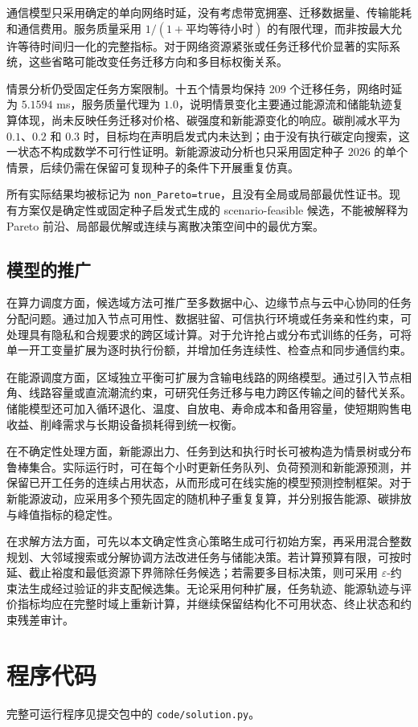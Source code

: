 \documentclass[withoutpreface,bwprint]{cumcmthesis}
\begin{document}
通信模型只采用确定的单向网络时延，没有考虑带宽拥塞、迁移数据量、传输能耗和通信费用。服务质量采用 $1/(1+\text{平均等待小时})$ 的有限代理，而非按最大允许等待时间归一化的完整指标。对于网络资源紧张或任务迁移代价显著的实际系统，这些省略可能改变任务迁移方向和多目标权衡关系。

情景分析仍受固定任务方案限制。十五个情景均保持 $209$ 个迁移任务，网络时延为 $5.1594$ ms，服务质量代理为 $1.0$，说明情景变化主要通过能源流和储能轨迹复算体现，尚未反映任务迁移对价格、碳强度和新能源变化的响应。碳削减水平为 $0.1$、$0.2$ 和 $0.3$ 时，目标均在声明启发式内未达到；由于没有执行碳定向搜索，这一状态不构成数学不可行性证明。新能源波动分析也只采用固定种子 $2026$ 的单个情景，后续仍需在保留可复现种子的条件下开展重复仿真。

所有实际结果均被标记为 \texttt{non\_Pareto=true}，且没有全局或局部最优性证书。现有方案仅是确定性或固定种子启发式生成的 scenario-feasible 候选，不能被解释为 Pareto 前沿、局部最优解或连续与离散决策空间中的最优方案。

\subsection{模型的推广}

在算力调度方面，候选域方法可推广至多数据中心、边缘节点与云中心协同的任务分配问题。通过加入节点可用性、数据驻留、可信执行环境或任务亲和性约束，可处理具有隐私和合规要求的跨区域计算。对于允许抢占或分布式训练的任务，可将单一开工变量扩展为逐时执行份额，并增加任务连续性、检查点和同步通信约束。

在能源调度方面，区域独立平衡可扩展为含输电线路的网络模型。通过引入节点相角、线路容量或直流潮流约束，可研究任务迁移与电力跨区传输之间的替代关系。储能模型还可加入循环退化、温度、自放电、寿命成本和备用容量，使短期购售电收益、削峰需求与长期设备损耗得到统一权衡。

在不确定性处理方面，新能源出力、任务到达和执行时长可被构造为情景树或分布鲁棒集合。实际运行时，可在每个小时更新任务队列、负荷预测和新能源预测，并保留已开工任务的连续占用状态，从而形成可在线实施的模型预测控制框架\cite{rawlings2017model}。对于新能源波动，应采用多个预先固定的随机种子重复复算，并分别报告能源、碳排放与峰值指标的稳定性。

在求解方法方面，可先以本文确定性贪心策略生成可行初始方案，再采用混合整数规划、大邻域搜索或分解协调方法改进任务与储能决策。若计算预算有限，可按时延、截止裕度和最低资源下界筛除任务候选；若需要多目标决策，则可采用 $\varepsilon$-约束法生成经过验证的非支配候选集\cite{miettinen1999nonlinear}。无论采用何种扩展，任务轨迹、能源轨迹与评价指标均应在完整时域上重新计算，并继续保留结构化不可用状态、终止状态和约束残差审计。

\appendix
\section{程序代码}
完整可运行程序见提交包中的 \texttt{code/solution.py}。



\end{document}

